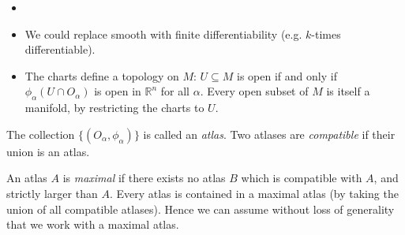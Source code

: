 \documentclass[12pt]{article}
\begin{document}
\begin{remark}
	\begin{itemize}
		\item[]
		\item We could replace smooth with finite differentiability (e.g. $k$-times differentiable).
		\item The charts define a topology on $M$: $U \subseteq M$ is open if and only if $\phi_\alpha(U \cap O_\alpha)$ is open in $\mathbb{R}^n$ for all $\alpha$. Every open subset of $M$ is itself a manifold, by restricting the charts to $U$.
	\end{itemize}
\end{remark}

The collection $\{(O_\alpha, \phi_\alpha)\}$ is called an \emph{atlas}. Two atlases are \emph{compatible} if their union is an atlas.

An atlas $A$ is \emph{maximal} if there exists no atlas $B$ which is compatible with $A$, and strictly larger than $A$. Every atlas is contained in a maximal atlas (by taking the union of all compatible atlases). Hence we can assume without loss of generality that we work with a maximal atlas.
\end{document}
